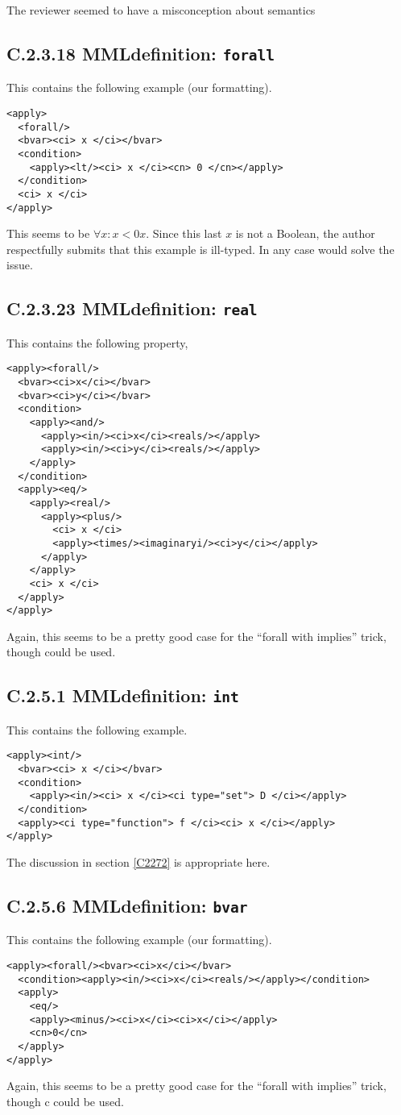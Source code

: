 \documentclass{llncs}
\begin{document}
\begin{newpart}{The reviewer seemed to have a misconception about semantics}
\subsection{C.2.3.18 MMLdefinition: {\tt forall}}\label{C2318}
This contains the following example (our formatting).
\begin{lstlisting}[language=MathML2]
<apply>
  <forall/>
  <bvar><ci> x </ci></bvar>
  <condition>
    <apply><lt/><ci> x </ci><cn> 0 </cn></apply>
  </condition>
  <ci> x </ci>
</apply>
\end{lstlisting}
This seems to be $\forall x:x<0 x$. Since this last $x$ is not a Boolean, the
author respectfully submits that this example is ill-typed. In any case
{} would solve the issue. 
\subsection{C.2.3.23 MMLdefinition: {\tt real}}\label{C2323}
This contains the following property,
\begin{lstlisting}[language=MathML2]
<apply><forall/>
  <bvar><ci>x</ci></bvar>
  <bvar><ci>y</ci></bvar>
  <condition>
    <apply><and/>
      <apply><in/><ci>x</ci><reals/></apply>
      <apply><in/><ci>y</ci><reals/></apply>
    </apply>
  </condition>
  <apply><eq/>
    <apply><real/>
      <apply><plus/>
        <ci> x </ci>
        <apply><times/><imaginaryi/><ci>y</ci></apply>
      </apply>
    </apply>
    <ci> x </ci>
  </apply>
</apply>
\end{lstlisting}
Again, this seems to be a pretty good case for the ``forall with implies''
trick, though {} could be used.
\subsection{C.2.5.1 MMLdefinition: {\tt int}}\label{C251}
This contains the following example.
\begin{lstlisting}[language=MathML2]
<apply><int/>
  <bvar><ci> x </ci></bvar>
  <condition>
    <apply><in/><ci> x </ci><ci type="set"> D </ci></apply>
  </condition>
  <apply><ci type="function"> f </ci><ci> x </ci></apply>
</apply>
\end{lstlisting}
The discussion in section \ref{C2272} is appropriate here.
\subsection{C.2.5.6 MMLdefinition: {\tt bvar}}\label{C256}
This contains the following example (our formatting).
\begin{lstlisting}[language=MathML2]
<apply><forall/><bvar><ci>x</ci></bvar>
  <condition><apply><in/><ci>x</ci><reals/></apply></condition>
  <apply>
    <eq/>
    <apply><minus/><ci>x</ci><ci>x</ci></apply>
    <cn>0</cn>
  </apply>
</apply>
\end{lstlisting}
Again, this seems to be a pretty good case for the ``forall with implies''
trick, though c{} could be used.

\end{newpart}
\end{document}
